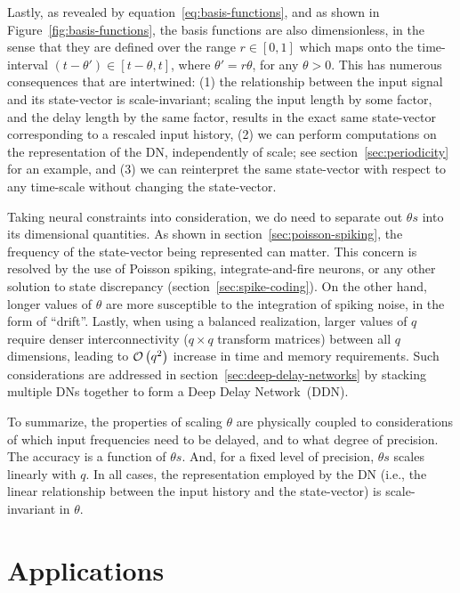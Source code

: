 Lastly, as revealed by equation~\ref{eq:basis-functions}, and as shown in Figure~\ref{fig:basis-functions}, the basis functions are also dimensionless, in the sense that they are defined over the range $r \in [0, 1]$ which maps onto the time-interval $(t - \theta') \in [t - \theta, t]$, where $\theta' = r \theta$, for any $\theta > 0$.
This has numerous consequences that are intertwined: (1) the relationship between the input signal and its state-vector is scale-invariant; scaling the input length by some factor, and the delay length by the same factor, results in the exact same state-vector corresponding to a rescaled input history, (2) we can perform computations on the representation of the DN, independently of scale; see section~\ref{sec:periodicity} for an example, and (3) we can reinterpret the same state-vector with respect to any time-scale without changing the state-vector.

Taking neural constraints into consideration, we do need to separate out $\theta s$ into its dimensional quantities.
As shown in section~\ref{sec:poisson-spiking}, the frequency of the state-vector being represented can matter.
This concern is resolved by the use of Poisson spiking, integrate-and-fire neurons, or any other solution to state discrepancy (section~\ref{sec:spike-coding}).
On the other hand, longer values of $\theta$ are more susceptible to the integration of spiking noise, in the form of ``drift''.
Lastly, when using a balanced realization, larger values of $q$ require denser interconnectivity ($q \times q$ transform matrices) between all $q$ dimensions, leading to $\mathcal{O}\left({q^2}\right)$ increase in time and memory requirements.
Such considerations are addressed in section~\ref{sec:deep-delay-networks} by stacking multiple DNs together to form a Deep Delay Network~(DDN).

To summarize, the properties of scaling $\theta$ are physically coupled to considerations of which input frequencies need to be delayed, and to what degree of precision.
The accuracy is a function of $\theta s$.
And, for a fixed level of precision, $\theta s$ scales linearly with $q$.
In all cases, the representation employed by the DN (i.e., the linear relationship between the input history and the state-vector) is scale-invariant in $\theta$.

\section{Applications}
\label{sec:delay-applications}


